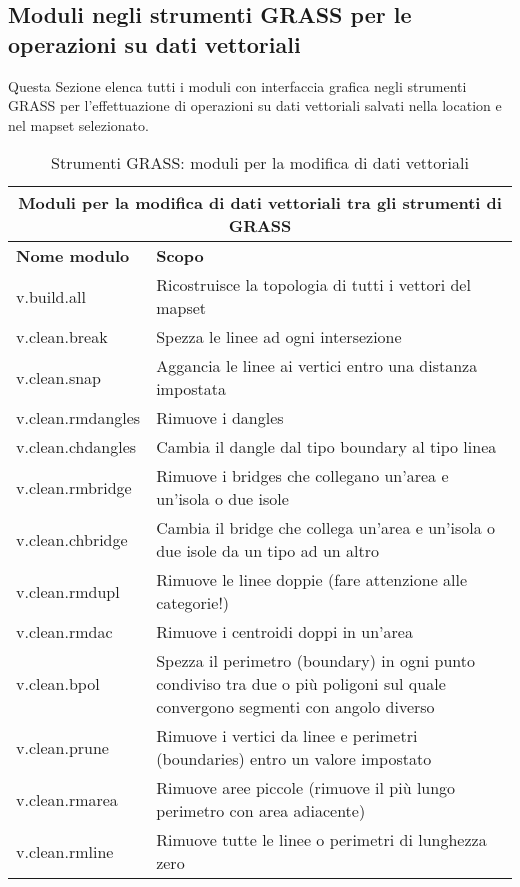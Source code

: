 \clearpage

\subsection{Moduli negli strumenti GRASS per le operazioni su dati vettoriali}

Questa Sezione elenca tutti i moduli con interfaccia grafica negli strumenti GRASS per l'effettuazione di operazioni su dati vettoriali salvati nella location e nel mapset selezionato.

\begin{table}[ht]
\centering
\caption{Strumenti GRASS: moduli per la modifica di dati vettoriali}\medskip
 \begin{tabular}{|p{4cm}|p{12cm}|}
  \hline \multicolumn{2}{|c|}{\textbf{Moduli per la modifica di dati vettoriali tra gli strumenti di GRASS}} \\
  \hline \textbf{Nome modulo} & \textbf{Scopo} \\
  \hline v.build.all & Ricostruisce la topologia di tutti i vettori del mapset \\
  \hline v.clean.break & Spezza le linee ad ogni intersezione \\
  \hline v.clean.snap & Aggancia le linee ai vertici entro una distanza impostata \\
  \hline v.clean.rmdangles & Rimuove i dangles \\
  \hline v.clean.chdangles & Cambia il dangle dal tipo boundary al tipo linea \\
  \hline v.clean.rmbridge & Rimuove i bridges che collegano un'area e un'isola o due isole \\
  \hline v.clean.chbridge & Cambia il bridge che collega un'area e un'isola o due isole da un tipo ad un altro \\
  \hline v.clean.rmdupl & Rimuove le linee doppie (fare attenzione alle categorie!) \\
  \hline v.clean.rmdac & Rimuove i centroidi doppi in un'area \\
  \hline v.clean.bpol & Spezza il perimetro (boundary) in ogni punto condiviso tra due o più poligoni sul quale convergono segmenti con angolo diverso \\
  \hline v.clean.prune & Rimuove i vertici da linee e perimetri (boundaries) entro un valore impostato \\
  \hline v.clean.rmarea & Rimuove aree piccole (rimuove il più lungo perimetro con area adiacente) \\
  \hline v.clean.rmline & Rimuove tutte le linee o perimetri di lunghezza zero \\

\end{tabular}
\end{table}
